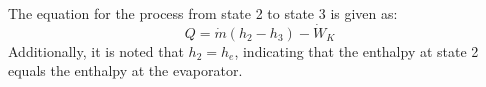 The equation for the process from state 2 to state 3 is given as:  
\[
Q = \dot{m} (h_2 - h_3) - \dot{W}_K
\]  
Additionally, it is noted that \( h_2 = h_e \), indicating that the enthalpy at state 2 equals the enthalpy at the evaporator.